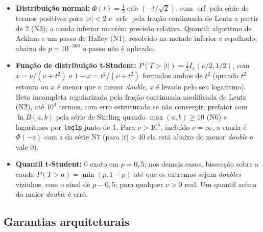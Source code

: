 \documentclass[11pt,a4paper]{article}
\begin{document}
\begin{itemize}
  \item \textbf{Distribuição normal:} \(\Phi(t) = \tfrac{1}{2}\operatorname{erfc}(-t/\sqrt{2})\), com \(\operatorname{erf}\) pela série de termos positivos para \(|x| < 2\) e \(\operatorname{erfc}\) pela fração continuada de Lentz a partir de 2 (N3); a cauda inferior mantém precisão relativa. Quantil: algoritmo de Acklam e um passo de Halley (N1), resolvido na metade inferior e espelhado; abaixo de \(p = 10^{-300}\) o passo não é aplicado.
  \item \textbf{Função de distribuição t-Student:} \(P(T > |t|) = \tfrac{1}{2} I_x(\nu/2, 1/2)\), com \(x = \nu/(\nu + t^2)\) e \(1 - x = t^2/(\nu + t^2)\) formados ambos de \(t^2\) (quando \(t^2\) estoura ou \(x\) é menor que o menor \emph{double}, \(x\) é levado pelo seu logaritmo). Beta incompleta regularizada pela fração continuada modificada de Lentz (N2), até \(10^4\) termos, com erro estruturado se não convergir; prefator com \(\ln B(a, b)\) pela série de Stirling quando \(\max(a, b) \geq 10\) (N6) e logaritmos por \texttt{log1p} junto de 1. Para \(\nu > 10^{5}\), incluído \(\nu = \infty\), a cauda é \(\Phi(-z)\) com \(z\) da série N7 (para \(|t| > 40\) ela está abaixo do menor \emph{double} e vale 0).
  \item \textbf{Quantil t-Student:} 0 exato em \(p = 0{,}5\); nos demais casos, bissecção sobre a cauda \(P(T > a) = \min(p, 1 - p)\) até que os extremos sejam \emph{doubles} vizinhos, com o sinal de \(p - 0{,}5\); para qualquer \(\nu > 0\) real. Um quantil acima do maior \emph{double} é erro.
\end{itemize}

\subsection{Garantias arquiteturais}
\end{document}
